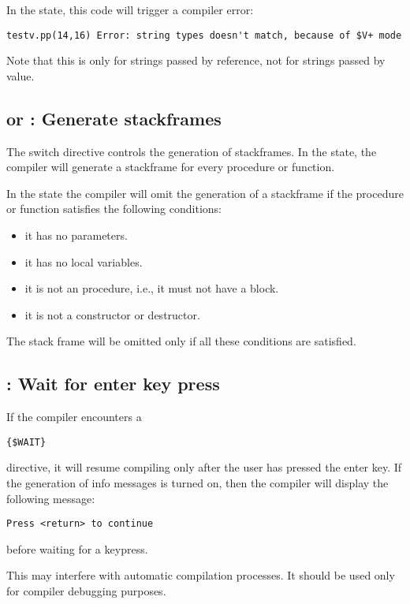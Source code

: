 In the  state, this code will trigger a compiler error:
\begin{verbatim}
testv.pp(14,16) Error: string types doesn't match, because of $V+ mode
\end{verbatim}
Note that this is only for strings passed by reference, not for strings
passed by value.

\subsection{ or  : Generate stackframes}

The  switch directive controls the generation of stackframes.
In the  state, the compiler will generate a stackframe for every procedure or function.

In the  state the compiler will omit the generation of a
stackframe if the procedure or function satisfies the following conditions:

\begin{itemize}
\item it has no parameters.
\item it has no local variables.
\item it is not an  procedure, i.e., it must not have
a  block.
\item it is not a constructor or destructor.
\end{itemize}
The stack frame will be omitted only if all these conditions are satisfied.

\subsection{ : Wait for enter key press}

If the compiler encounters a
\begin{verbatim}
{$WAIT}
\end{verbatim}
directive, it will resume compiling only after the user has pressed the
enter key. If the generation of info messages is turned on, then the compiler
will display the following message:
\begin{verbatim}
Press <return> to continue
\end{verbatim}
before waiting for a keypress.
\begin{remark}
This may interfere with automatic compilation processes. 
It should be used only for compiler debugging purposes.
\end{remark}

